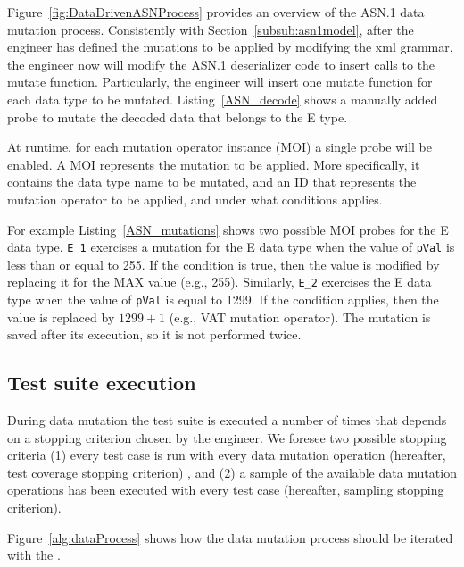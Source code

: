 Figure~\ref{fig:DataDrivenASNProcess} provides an overview of the ASN.1 data mutation process. 
Consistently with Section~\ref{subsub:asn1model}, after the engineer has defined the mutations to be applied by modifying the xml grammar, the engineer now will modify the ASN.1 deserializer code to insert calls to the mutate function. Particularly, the engineer will insert one mutate function for each data type to be mutated.
Listing~\ref{ASN_decode} shows a manually added probe to mutate the decoded data that belongs to the E type.

At runtime, for each mutation operator instance (MOI) a single probe will be enabled. A MOI represents the mutation to be applied. More specifically, it contains the data type name to be mutated, and an ID that represents the mutation operator to be applied, and under what conditions applies.

For example Listing~\ref{ASN_mutations} shows two possible MOI probes for the E data type. 
\texttt{E\_1} exercises a mutation for the E data type when the value of \texttt{pVal} is less than or equal to 255. If the condition is true, then the value is modified by replacing it for the MAX value (e.g., 255).
Similarly, \texttt{E\_2} exercises the E data type when the value of \texttt{pVal} is equal to 1299. If the condition applies, then the value is replaced by $1299 + 1$ (e.g., VAT mutation operator).
The mutation is saved after its execution, so it is not performed twice. 






\clearpage
\subsection{Test suite execution}
\label{sec:mutantsExecution}

During data mutation the test suite is executed a number of times that depends on a stopping criterion chosen by the engineer. We foresee two possible stopping criteria (1) every test case is run with every data mutation operation (hereafter, test coverage stopping criterion)
, and (2) a sample of the available data mutation operations has been executed with every test case (hereafter, sampling stopping criterion).



Figure~\ref{alg:dataProcess} shows how the data mutation process should be iterated with
 the . 

